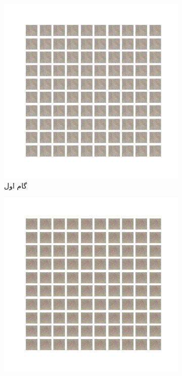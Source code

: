 \documentclass[12pt, a4paper]{book}
\begin{document}
\begin{figure}[h]
    \begin{subfigure}{0.3\linewidth}
        \includegraphics[width=\linewidth]{images/fcgan/nlayer3/generated_img_01.png}
        \caption{گام اول}
    \end{subfigure}
    \begin{subfigure}{0.3\linewidth}
        \includegraphics[width=\linewidth]{images/fcgan/nlayer3/generated_img_15.png}

\end{subfigure}
\end{figure}
\end{document}
